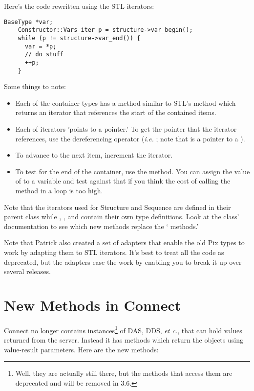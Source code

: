 \documentclass[justify]{dods-paper}
\begin{document}
Here's the code rewritten using the STL iterators:

\begin{lstlisting}[caption={STL iterators}]
    BaseType *var;
    Constructor::Vars_iter p = structure->var_begin();
    while (p != structure->var_end()) {
      var = *p;      
      // do stuff
      ++p;
    }
\end{lstlisting}

Some things to note:
\begin{itemize}
\item Each of the container types has a method similar to STL's
   method which returns an iterator that references the
  start of the contained items.
\item Each of iterators 'points to a pointer.' To get the
   pointer that the iterator  references, use the
  dereferencing operator \lit{*} ({\it i.e.} ; note that
   is a pointer to a ).
\item To advance to the next item, increment the iterator.
\item To test for the end of the container, use the 
  method. You can assign the value of  to a variable
  and test against that if you think the cost of calling the method
  in a loop is too high.
\end{itemize}

Note that the iterators used for Structure and Sequence are defined in
their parent class  while , ,
 and  contain their own type definitions. Look
at the class' documentation to see which new methods replace the
` methods.'

Note that Patrick also created a set of  adapters that enable
the old Pix types to work by adapting them to STL iterators. It's best
to treat all the  code as deprecated, but the adapters ease
the work by enabling you to break it up over several releases.

\section{New Methods in Connect}

Connect no longer contains instances\footnote{Well, they are actually
  still there, but the methods that access them are deprecated and
  will be removed in 3.6.} of DAS, DDS, {\it et c.}, that can hold
values returned from the server. Instead it has methods which return
the objects using value-result parameters. Here are the new methods:
\end{document}
